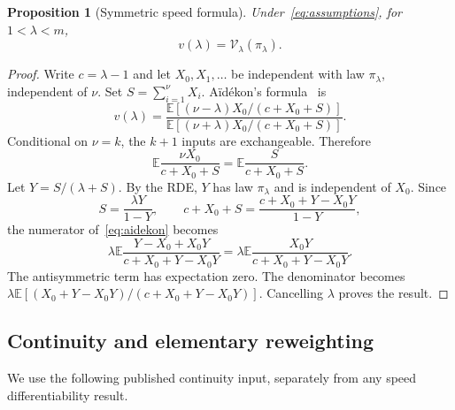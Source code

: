 \documentclass[11pt,a4paper]{article}
\numberwithin{equation}{section}
\theoremstyle{plain}
\newtheorem{proposition}[proposition]{Proposition}
\theoremstyle{definition}
\theoremstyle{remark}
\newcommand{\E}{\mathbb E}
\newcommand{\V}{\mathcal V}
\begin{document}
\begin{proposition}[Symmetric speed formula]\label{prop:symmetric}
Under~\eqref{eq:assumptions}, for $1<\lambda<m$,
\begin{equation}\label{eq:symmetric-speed}
 v(\lambda)=\V_\lambda(\pi_\lambda).
\end{equation}
\end{proposition}
\begin{proof}
Write $c=\lambda-1$ and let $X_0,X_1,\ldots$ be independent with law
$\pi_\lambda$, independent of $\nu$.  Set $S=\sum_{i=1}^{\nu}X_i$.
A\"id\'ekon's formula~\cite[Theorem 1.1]{A14} is
\begin{equation}\label{eq:aidekon}
 v(\lambda)
 =\frac{\E[(\nu-\lambda)X_0/(c+X_0+S)]}
        {\E[(\nu+\lambda)X_0/(c+X_0+S)]}.
\end{equation}
Conditional on $\nu=k$, the $k+1$ inputs are exchangeable.  Therefore
\begin{equation}\label{eq:exchange}
 \E\frac{\nu X_0}{c+X_0+S}
 =\E\frac S{c+X_0+S}.
\end{equation}
Let $Y=S/(\lambda+S)$.  By the RDE, $Y$ has law $\pi_\lambda$ and is
independent of $X_0$.  Since
\begin{equation}\label{eq:algebra-S}
 S=\frac{\lambda Y}{1-Y},\qquad
 c+X_0+S=\frac{c+X_0+Y-X_0Y}{1-Y},
\end{equation}
the numerator of~\eqref{eq:aidekon} becomes
\begin{equation}
 \lambda\E\frac{Y-X_0+X_0Y}{c+X_0+Y-X_0Y}
 =\lambda\E\frac{X_0Y}{c+X_0+Y-X_0Y}.
\end{equation}
The antisymmetric term has expectation zero.  The denominator becomes
$\lambda\E[(X_0+Y-X_0Y)/(c+X_0+Y-X_0Y)]$.  Cancelling $\lambda$ proves
the result.
\end{proof}

\subsection{Continuity and elementary reweighting}

We use the following published continuity input, separately from any
speed differentiability result.
\end{document}
